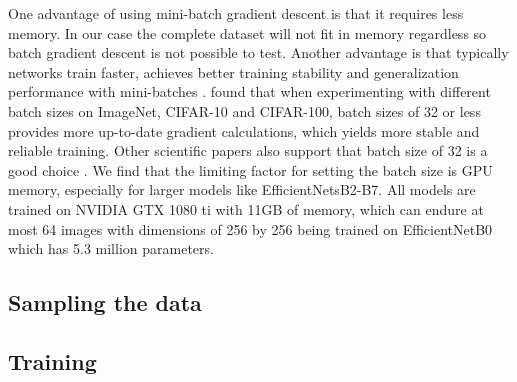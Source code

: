 \documentclass[thesis.tex]{subfiles}
\begin{document}
One advantage of using mini-batch gradient descent is that it requires less memory. In our case the complete dataset will not fit in memory regardless so batch gradient descent is not possible to test. Another advantage is that typically networks train faster, achieves better training stability and generalization performance with mini-batches \cite{RevisitingSmall18}. \citeauthor{RevisitingSmall18} found that when experimenting with different batch sizes on ImageNet, CIFAR-10 and CIFAR-100, batch sizes of 32 or less provides more up-to-date gradient calculations, which yields more stable and reliable training. Other scientific papers also support that batch size of 32 is a good choice \cite{PracticalRecommendations12, GeneralInefficiency03}.
We find that the limiting factor for setting the batch size is GPU memory, especially for larger models like EfficientNetsB2-B7. All models are trained on NVIDIA GTX 1080 ti with 11GB of memory, which can endure at most 64 images with dimensions of 256 by 256 being trained on EfficientNetB0 which has 5.3 million parameters.



\subsection{Sampling the data}



\subsection{Training}
\end{document}
